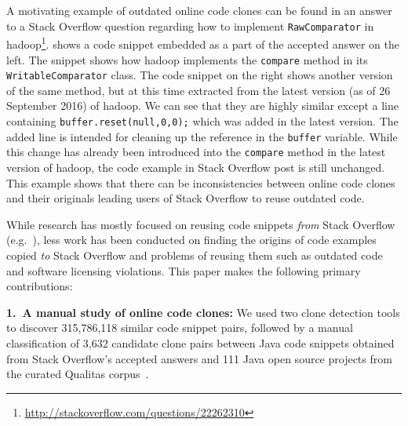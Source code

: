 \documentclass[sigconf,review, anonymous]{acmart}
\begin{document}
A motivating example of outdated online code clones can be found in an
answer to a Stack Overflow question regarding how to implement
{\small{\texttt{RawComparator}}} in
\textsf{hadoop}\footnote{\url{http://stackoverflow.com/questions/22262310}}.
 shows a code snippet embedded as a part of the
accepted answer on the left. The snippet shows how \textsf{hadoop}
implements the {\small{\texttt{compare}}} method in its
{\small{\texttt{WritableComparator}}} class. The code snippet on the
right shows another version of the same method, but at this time
extracted from the latest version (as of 26 September 2016) of
\textsf{hadoop}. We can see that they are highly similar except a line
containing {\small{\verb|buffer.reset(null,0,0);|}} which was added in
the latest version. The added line is intended for cleaning up the
reference in the {\small{\verb|buffer|}} variable. While this change
has already been introduced into the {\small{\texttt{compare}}} method
in the latest version of \textsf{hadoop}, the code example in Stack
Overflow post is still unchanged. This example shows that there can be
inconsistencies between online code clones and their originals leading
users of Stack Overflow to reuse outdated code.

While research has mostly focused on reusing code snippets \emph{from}
Stack Overflow (e.g.~\cite{Keivanloo2014,An2017,Yang2016}), less work
has been conducted on finding the origins of code examples copied
\emph{to} Stack Overflow and problems of reusing them such as outdated
code and software licensing violations. This paper makes the following
primary contributions:

\vspace{0.5ex}%
\noindent\textbf{1.~A manual study of online code clones:} 
We used two clone detection tools to discover 315,786,118 similar code
snippet pairs, followed by a manual classification of 3,632 candidate
clone pairs between Java code snippets obtained from Stack Overflow's
accepted answers and 111 Java open source projects from the curated
Qualitas corpus~\cite{QualitasCorpus}.
\end{document}
